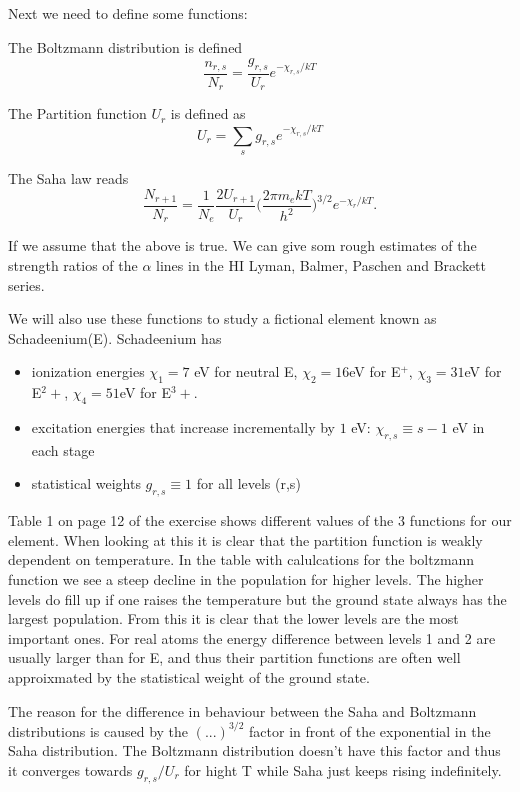\documentclass{aa}   %
\begin{document}
Next we need to define some functions:

The Boltzmann distribution is defined
\begin{equation}
\frac{n_{r,s}}{N_r} = \frac{g_{r,s}}{U_r} e^{-\chi_{r,s}/kT} 
\end{equation}\label{Boltzmann}

The Partition function $U_r$ is defined as
\begin{equation}
 U_r = \sum_s g_{r,s} e^{-\chi_{r,s}/kT}
\end{equation}\label{Partition}

The Saha law reads
\begin{equation}
 \frac{N_{r+1}}{N_r} = \frac{1}{N_e}\frac{2U_{r+1}}{U_r}\bigg(\frac{2\pi m_e kT}{h^2}\bigg)^{3/2} e^{-\chi_r/kT}.
\end{equation}\label{Saha}

If we assume that the above is true. We can give som rough estimates of the strength ratios of the $\alpha$ lines in the HI Lyman, Balmer, Paschen and Brackett series. 

We will also use these functions to study a fictional element known as Schadeenium(E).
Schadeenium has 
\begin{itemize}
\item
ionization energies $\chi_1 = 7$ eV for neutral E, $\chi_2 = 16$eV for E$^+$, $\chi_3 = 31$eV for E$^2+$, $\chi_4 = 51$eV for E$^3+$. 
\item
excitation energies that increase incrementally by $1$ eV: $\chi_{r,s} \equiv s -1$ eV in each stage
\item
statistical weights $g_{r,s} \equiv 1$ for all levels (r,s)
\end{itemize}

Table 1 on page 12 of the exercise shows different values of the 3 functions for our element.
When looking at this it is clear that the partition function is weakly dependent on temperature.
In the table with calulcations for the boltzmann function we see a steep decline in the population for higher levels.
The higher levels do fill up if one raises the temperature but the ground state always has the largest population.
From this it is clear that the lower levels are the most important ones. For real atoms the energy difference between levels 1 and 2 are usually larger than for E, and thus their partition functions are often well approixmated by the statistical weight of the ground state.

The reason for the difference in behaviour between the Saha and Boltzmann distributions is caused by the $(...)^{3/2}$ factor in front of the exponential in the Saha distribution. The Boltzmann distribution doesn't have this factor and thus it converges towards $g_{r,s}/U_r$ for hight T while Saha just keeps rising indefinitely.
\end{document}
